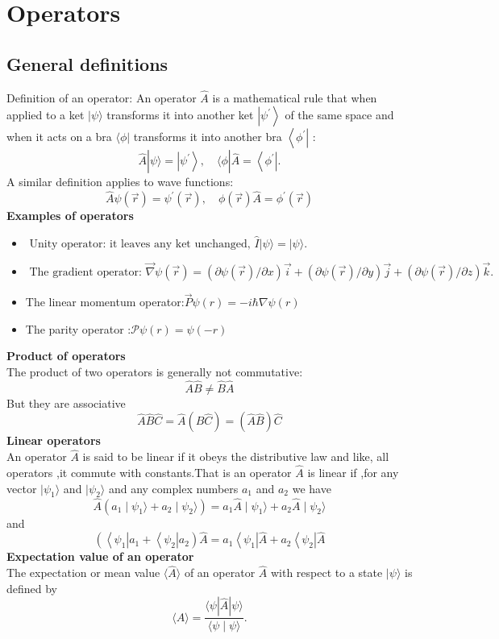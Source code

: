 \section{Operators}
\subsection{General definitions}
 Definition of an operator: An operator $ \hat{A}$ is a mathematical rule that when applied to a ket $|\psi\rangle$ transforms it into another ket $\left|\psi^{\prime}\right\rangle$ of the same space and when it acts on a bra $\langle\phi|$ transforms it into another bra $\left\langle\phi^{\prime}\right|$ :
 $$
 \hat{A}|\psi\rangle=\left|\psi^{\prime}\right\rangle, \quad\langle\phi| \hat{A}=\left\langle\phi^{\prime}\right| .
 $$
 A similar definition applies to wave functions:
 $$
 \hat{A} \psi(\vec{r})=\psi^{\prime}(\vec{r}), \quad \phi(\vec{r}) \hat{A}=\phi^{\prime}(\vec{r})
 $$
 \textbf{Examples of operators}
 \begin{itemize}
 	\item $\text { Unity operator: it leaves any ket unchanged, } \hat{I}|\psi\rangle=|\psi\rangle \text {. }$
 	\item $\text { The gradient operator: } \vec{\nabla} \psi(\vec{r})=(\partial \psi(\vec{r}) / \partial x) \vec{i}+(\partial \psi(\vec{r}) / \partial y) \vec{j}+(\partial \psi(\vec{r}) / \partial z) \vec{k} \text {. }$
 	\item The linear momentum operator:$\vec{P}\psi(r)=-i\hbar \nabla \psi(r)$ 
 	\item The parity operator :$\mathcal{P}\psi(r)=\psi(-r)$
 \end{itemize}
\textbf{Product of operators}\\
The product of two operators is generally not commutative:\\
$$\hat{A}\hat{B}\neq \hat{B}\hat{A}$$
But they are associative\\
$$\hat{A}\hat{B}\hat{C}=\hat{A}(\hat{B}\hat{C})=(\hat{A}\hat{B})\hat{C}$$
\textbf{Linear operators}\\
An operator $\hat{A}$ is said to be linear if it obeys the distributive law and like, all operators ,it commute with constants.That is an operator $\hat{A}$ is linear if ,for any vector $|\psi_{1}\rangle $ and $|\psi_{2}\rangle $ and any complex numbers $a_1$ and $a_2$ we have\\
$$\hat{A}(a_1\mid \psi_{1}\rangle +a_2\mid \psi_{2}\rangle)=a_1 \hat{A} \mid \psi_{1}\rangle +a_2\hat{A}\mid \psi_{2}\rangle $$
and
$$\left(\left\langle\psi_{1}\right| a_{1}+\left\langle\psi_{2}\right| a_{2}\right) \hat{A}=a_{1}\left\langle\psi_{1}\right| \hat{A}+a_{2}\left\langle\psi_{2}\right| \hat{A}$$
\textbf{Expectation value of an operator}\\
The expectation or mean value $\langle\hat{A}\rangle$ of an operator $\hat{A}$ with respect to a state $|\psi\rangle$ is defined by
$$
\langle\hat{A}\rangle=\frac{\langle\psi|\hat{A}| \psi\rangle}{\langle\psi \mid \psi\rangle} .
$$
